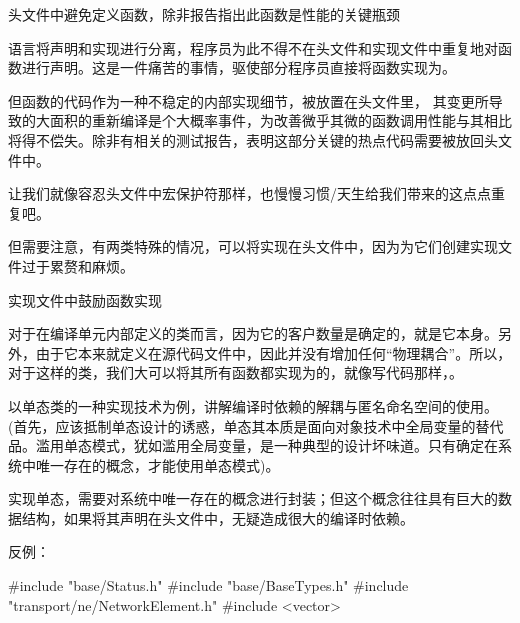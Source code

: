 \begin{content}

\begin{regulation}
头文件中避免定义函数，除非报告指出此函数是性能的关键瓶颈
\end{regulation}

\cpp{}语言将声明和实现进行分离，程序员为此不得不在头文件和实现文件中重复地对函数进行声明。这是一件痛苦的事情，驱使部分程序员直接将函数实现为。

但函数的代码作为一种不稳定的内部实现细节，被放置在头文件里，
其变更所导致的大面积的重新编译是个大概率事件，为改善微乎其微的函数调用性能与其相比将得不偿失。除非有相关的测试报告，表明这部分关键的热点代码需要被放回头文件中。

让我们就像容忍头文件中宏保护符那样，也慢慢习惯\clang{}/\cpp{}天生给我们带来的这点点重复吧。

但需要注意，有两类特殊的情况，可以将实现在头文件中，因为为它们创建实现文件过于累赘和麻烦。

\begin{enum}
\end{enum}

\begin{regulation}
实现文件中鼓励函数实现
\end{regulation}

对于在编译单元内部定义的类而言，因为它的客户数量是确定的，就是它本身。另外，由于它本来就定义在源代码文件中，因此并没有增加任何“物理耦合”。所以，对于这样的类，我们大可以将其所有函数都实现为的，就像写代码那样，。

以单态类的一种实现技术为例，讲解编译时依赖的解耦与匿名命名空间的使用。(首先，应该抵制单态设计的诱惑，单态其本质是面向对象技术中全局变量的替代品。滥用单态模式，犹如滥用全局变量，是一种典型的设计坏味道。只有确定在系统中唯一存在的概念，才能使用单态模式)。

实现单态，需要对系统中唯一存在的概念进行封装；但这个概念往往具有巨大的数据结构，如果将其声明在头文件中，无疑造成很大的编译时依赖。

反例：
\begin{leftbar}
\begin{c++}
#include "base/Status.h"
#include "base/BaseTypes.h"
#include "transport/ne/NetworkElement.h"
#include <vector>


\end{c++}
\end{leftbar}
\end{content}
